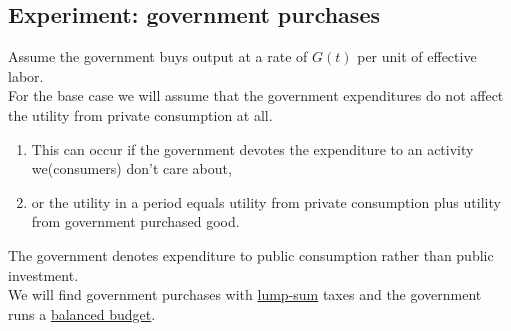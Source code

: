 \documentclass[]{article}
\begin{document}
		\subsection{Experiment: government purchases}
			\begin{assumption}
				Assume the government buys output at a rate of $G(t)$ per unit of effective labor. \\
				For the base case we will assume that the government expenditures do not affect the utility from private consumption at all. 
				\begin{enumerate}
				\item This can occur if the government devotes the expenditure to an activity we(consumers) don't care about, 
				\item or the utility in a period equals utility from private consumption plus utility from government purchased good.
				\end{enumerate}
				The government denotes expenditure to public consumption rather than public investment. \\
				We will find government purchases with \ul{lump-sum} taxes and the government runs a \ul{balanced budget}.
			\end{assumption}
\end{document}
